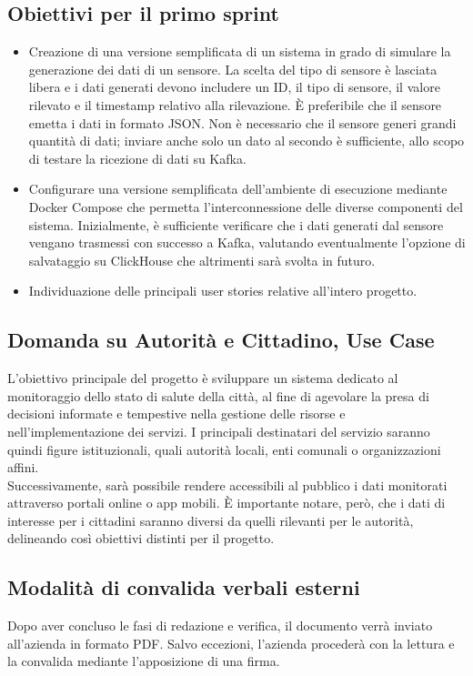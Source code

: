 \documentclass{article}
\begin{document}
    \subsection{Obiettivi per il primo sprint}
        \begin{itemize}
            \item Creazione di una versione semplificata di un sistema in grado di simulare la generazione dei dati di un sensore. La scelta del tipo di sensore è lasciata libera e i dati generati devono includere un ID, il tipo di sensore, il valore rilevato e il timestamp relativo alla rilevazione. È preferibile che il sensore emetta i dati in formato JSON. Non è necessario che il sensore generi grandi quantità di dati; inviare anche solo un dato al secondo è sufficiente, allo scopo di testare la ricezione di dati su Kafka.
            \item Configurare una versione semplificata dell'ambiente di esecuzione mediante Docker Compose che permetta l'interconnessione delle diverse componenti del sistema. Inizialmente, è sufficiente verificare che i dati generati dal sensore vengano trasmessi con successo a Kafka, valutando eventualmente l'opzione di salvataggio su ClickHouse che altrimenti sarà svolta in futuro.
            \item Individuazione delle principali user stories relative all’intero progetto.
        \end{itemize}

    \subsection{Domanda su Autorità e Cittadino, Use Case}
        L'obiettivo principale del progetto è sviluppare un sistema dedicato al monitoraggio dello stato di salute della città, al fine di agevolare la presa di decisioni informate e tempestive nella gestione delle risorse e nell'implementazione dei servizi. I principali destinatari del servizio saranno quindi figure istituzionali, quali autorità locali, enti comunali o organizzazioni affini.\\
        Successivamente, sarà possibile rendere accessibili al pubblico i dati monitorati attraverso portali online o app mobili. È importante notare, però, che i dati di interesse per i cittadini saranno diversi da quelli rilevanti per le autorità, delineando così obiettivi distinti per il progetto.
    
    \subsection{Modalità di convalida verbali esterni}
        Dopo aver concluso le fasi di redazione e verifica, il documento verrà inviato all'azienda in formato PDF. Salvo eccezioni, l'azienda procederà con la lettura e la convalida mediante l'apposizione di una firma.
\end{document}

